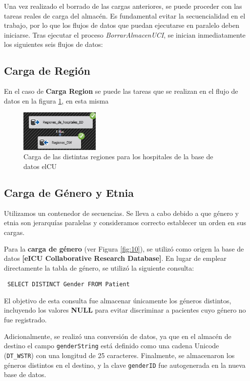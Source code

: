 \documentclass[12pt, a4paper, twoside]{article}
\begin{document}
	Una vez realizado el borrado de las cargas anteriores, se puede proceder con las tareas reales de carga del almacén. Es fundamental evitar la secuencialidad en el trabajo, por lo que los flujos de datos que puedan ejecutarse en paralelo deben iniciarse. Tras ejecutar el proceso \textit{BorrarAlmacenUCI}, se inician inmediatamente los siguientes seis flujos de datos:
	
	
	\subsection{Carga de Región}
	
	En el caso de \textbf{Carga Region} se puede las tareas que se realizan en el flujo de datos en la figura \ref{fig:4}, en esta misma 
	
	\begin{figure}[H]
		\centering
		\includegraphics[width=0.35\textwidth]{image/103_region.png}
		\caption{Carga de las distintas regiones para los hospitales de la base de datos elCU}
		\label{fig:4}
	\end{figure}
	
	
	\subsection{Carga de Género y Etnia}
	
	Utilizamos un contenedor de secuencias. Se lleva a cabo debido a que género y etnia son jerarquías paralelas y consideramos correcto establecer un orden en sus cargas.
	
	Para la \textbf{carga de género} (ver Figura \ref{fig:10}), se utilizó como origen la base de datos \textbf{[eICU Collaborative Research Database]}. En lugar de emplear directamente la tabla de género, se utilizó la siguiente consulta:
	
	\begin{verbatim} SELECT DISTINCT Gender FROM Patient \end{verbatim}
	
	El objetivo de esta consulta fue almacenar únicamente los géneros distintos, incluyendo los valores \textbf{NULL} para evitar discriminar a pacientes cuyo género no fue registrado.
	
	Adicionalmente, se realizó una conversión de datos, ya que en el almacén de destino el campo \texttt{genderString} está definido como una cadena Unicode (\texttt{DT\_WSTR}) con una longitud de 25 caracteres. Finalmente, se almacenaron los géneros distintos en el destino, y la clave \texttt{genderID} fue autogenerada en la nueva base de datos.
	
\end{document}
